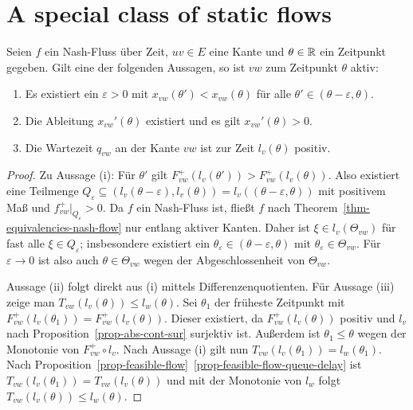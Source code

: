 \section{A special class of static flows}

\begin{lemma}\label{lemma-nash-flow-waiting-queue-implies-active-edge}
	Seien $f$ ein Nash-Fluss über Zeit, $uv\in E$ eine Kante und $\theta\in\mathbb{R}$ ein Zeitpunkt gegeben.
	Gilt eine der folgenden Aussagen, so ist $vw$ zum Zeitpunkt $\theta$ aktiv:
	\begin{enumerate}[label=(\roman*)]
		\item Es existiert ein $\varepsilon>0$ mit $x_{vw}(\theta')<x_{vw}(\theta)$ für alle $\theta'\in(\theta-\varepsilon, \theta)$.
		\item Die Ableitung $x_{vw}'(\theta)$ existiert und es gilt $x_{vw}'(\theta)> 0$.
		\item Die Wartezeit $q_{vw}$ an der Kante $vw$ ist zur Zeit $l_v(\theta)$ positiv.
	\end{enumerate}
\end{lemma}
\begin{proof}
	Zu Aussage (i): Für $\theta'$ gilt $F_{vw}^+(l_v(\theta')) > F_{vw}^+(l_v(\theta))$.
	Also existiert eine Teilmenge $Q_\varepsilon \subseteq (l_v(\theta-\varepsilon), l_v(\theta))=l_v((\theta - \varepsilon, \theta))$ mit positivem Maß und $f_{vw}^+\big|_{Q_\varepsilon} > 0$.
	Da $f$ ein Nash-Fluss ist, fließt $f$ nach Theorem~\ref{thm-equivalencies-nash-flow} nur entlang aktiver Kanten.
	Daher ist $\xi\in l_v(\Theta_{vw})$ für fast alle $\xi\in Q_\varepsilon$; insbesondere existiert ein $\theta_\varepsilon\in (\theta-\varepsilon, \theta)$ mit $\theta_\varepsilon\in\Theta_{vw}$.
	Für $\varepsilon\rightarrow0$ ist also auch $\theta\in\Theta_{vw}$ wegen der Abgeschlossenheit von $\Theta_{vw}$.
	
	Aussage (ii) folgt direkt aus (i) mittels Differenzenquotienten.
	Für Aussage (iii) zeige man $T_{vw}(l_v(\theta)) \leq l_w(\theta)$.
	Sei $\theta_1$ der früheste Zeitpunkt mit $F_{vw}^+(l_v(\theta_1)) = F_{vw}^+(l_v(\theta))$.
	Dieser existiert, da $F_{vw}^+(l_v(\theta))$ positiv und $l_v$ nach Proposition~\ref{prop-abs-cont-sur} surjektiv ist.
	Außerdem ist $\theta_1 \leq \theta$ wegen der Monotonie von $F_{vw}^+ \circ l_v$.
	Nach Aussage (i) gilt nun $T_{vw}(l_v(\theta_1)) = l_w(\theta_1)$.
	Nach Proposition~\ref{prop-feasible-flow}~\ref{prop-feasible-flow-queue-delay} ist $T_{vw}(l_v(\theta_1)) = T_{vw}(l_v(\theta))$ und mit der Monotonie von $l_w$ folgt $T_{vw}(l_v(\theta))\leq l_w(\theta)$.
\end{proof}

